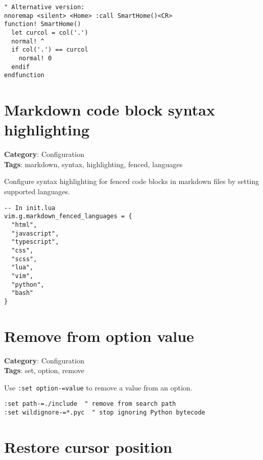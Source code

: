 {{{\begin{Exa*}{}
\begin{Verbatim}[fontsize=\footnotesize, breaklines, breakanywhere]
" Alternative version:
nnoremap <silent> <Home> :call SmartHome()<CR>
function! SmartHome()
  let curcol = col('.')
  normal! ^
  if col('.') == curcol
    normal! 0
  endif
endfunction
\end{Verbatim}
\end{Exa*}

\section{Markdown code block syntax highlighting}

\textbf{Category}: Configuration\\ \textbf{Tags}: markdown, syntax, highlighting, fenced, languages
\vspace{0.5cm}

Configure syntax highlighting for fenced code blocks in markdown files by setting supported languages.

\begin{Exa*}{}
\begin{Verbatim}[fontsize=\footnotesize, breaklines, breakanywhere]
-- In init.lua
vim.g.markdown_fenced_languages = { 
  "html", 
  "javascript", 
  "typescript", 
  "css", 
  "scss", 
  "lua", 
  "vim",
  "python",
  "bash"
}
\end{Verbatim}
\end{Exa*}

\section{Remove from option value}

\textbf{Category}: Configuration\\ \textbf{Tags}: set, option, remove
\vspace{0.5cm}

Use {\footnotesize \Verb§:set option-=value§} to remove a value from an option.

\begin{Exa*}{}
\begin{Verbatim}[fontsize=\footnotesize, breaklines, breakanywhere]
:set path-=./include  " remove from search path
:set wildignore-=*.pyc  " stop ignoring Python bytecode
\end{Verbatim}
\end{Exa*}

\section{Restore cursor position}

}}}
